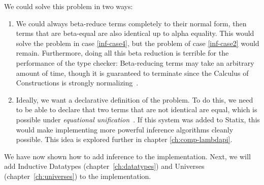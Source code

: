 We could solve this problem in two ways:

\begin{enumerate}
	\item We could always beta-reduce terms completely to their normal form, then terms that are beta-equal are also identical up to alpha equality. This would solve the problem in case \ref{inf-case4}, but the problem of case \ref{inf-case2} would remain. Furthermore, doing all this beta reduction is terrible for the performance of the type checker: Beta-reducing terms may take an arbitrary amount of time, though it is guaranteed to terminate since the Calculus of Constructions is strongly normalizing~\cite{Coquand_Huet_1988}.
	\item Ideally, we want a declarative definition of the problem. To do this, we need to be able to declare that two terms that are not identical are equal, which is possible under \emph{equational unification}~\cite[Section 2.1]{Siekmann86}. If this system was added to Statix, this would make implementing more powerful inference algorithms cleanly possible. This idea is explored further in chapter \ref{ch:comp-lambdapi}.
\end{enumerate}

We have now shown how to add inference to the implementation. Next, we will add Inductive Datatypes (chapter~\ref{ch:datatypes}) and Universes (chapter~\ref{ch:universes}) to the implementation.

